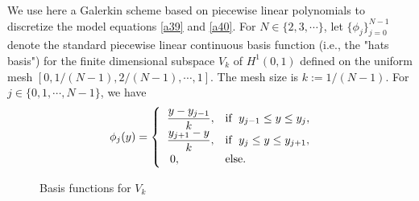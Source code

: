 \documentclass{article}
\begin{document}
We use here a Galerkin scheme based on piecewise linear polynomials to discretize the model equations \eqref{a39} and \eqref{a40}. For $N \in \{  2, 3,\cdots\}$, let $\{\phi_j\}_{j=0}^{N-1}$
denote the standard piecewise linear continuous basis function (i.e., the "hats  basis") for the finite dimensional subspace $V_k$ of $H^1(0, 1)$ defined on the uniform mesh $[0, 1/(N-1), 2/(N-1), \cdots, 1]$. The mesh size is $k := 1/(N-1)$. For $j\in \{ 0, 1,\cdots, N-1\}$, we have
\begin{equation*}
\phi_j(y) =  \begin{cases}
\displaystyle\;\;\frac{y - y_{j-1}}{k}, & \text{if\; $ y_{j-1} \leq y \leq y_j$},\\
\displaystyle\;\;\frac{y_{j+1}-y}{k}, & \text{if\; $  y_{j} \leq y \leq y_{j+1}$},\\
\;\;\;0, & \text{else}. \end{cases} 
\end{equation*}

\begin{figure}[h]
	\begin{center}
		\caption{Basis functions for $V_k$}
	\end{center}
\end{figure}
\end{document}
